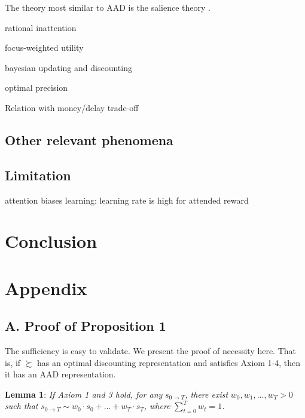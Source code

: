 \documentclass[
  12pt,
]{article}
\begin{document}
The theory most similar to AAD is the salience theory
\citep{bordalo2012salience, bordalo2013salience, bordalo2020memory}.

rational inattention

focus-weighted utility

bayesian updating and discounting

optimal precision

Relation with money/delay trade-off

\hypertarget{other-relevant-phenomena}{%
\subsection{Other relevant phenomena}\label{other-relevant-phenomena}}

\hypertarget{limitation}{%
\subsection{Limitation}\label{limitation}}

attention biases learning: learning rate is high for attended reward

\hypertarget{conclusion}{%
\section{Conclusion}\label{conclusion}}

\renewcommand\refname{Reference}
  

\newpage

\hypertarget{appendix}{%
\section{Appendix}\label{appendix}}

\hypertarget{a.-proof-of-proposition-1}{%
\subsection{A. Proof of Proposition 1}\label{a.-proof-of-proposition-1}}

The sufficiency is easy to validate. We present the proof of necessity
here. That is, if \(\succsim\) has an optimal discounting representation
and satisfies Axiom 1-4, then it has an AAD representation.

\noindent \textbf{Lemma 1}: \emph{If Axiom 1 and 3 hold, for any}
\(s_{0\rightarrow T}\)\emph{, there exist} \(w_0, w_1, …, w_T > 0\)
\emph{such that}
\(s_{0\rightarrow T} \sim w_0 \cdot s_0 + ...+w_T\cdot s_T\)\emph{,
where} \(\sum_{t=0}^T w_t=1\)\emph{.}
\end{document}
